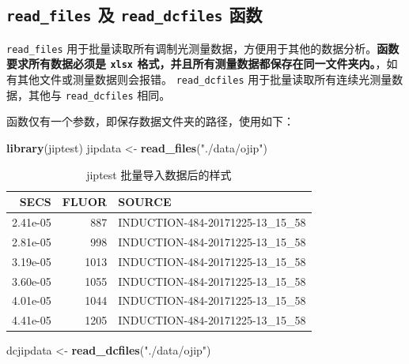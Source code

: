 \documentclass[]{krantz}
\makeatletter
\newenvironment{Shaded}{\begin{snugshade}}{\end{snugshade}}
\newcommand{\KeywordTok}[1]{\textcolor[rgb]{0.13,0.29,0.53}{\textbf{#1}}}
\newcommand{\StringTok}[1]{\textcolor[rgb]{0.31,0.60,0.02}{#1}}
\newcommand{\NormalTok}[1]{#1}
\newenvironment{kframe}{%
\medskip{}
\setlength{\fboxsep}{.8em}
 \def\at@end@of@kframe{}%
 \ifinner\ifhmode%
  \def\at@end@of@kframe{\end{minipage}}%
  \begin{minipage}{\columnwidth}%
 \fi\fi%
 \def\FrameCommand##1{\hskip\@totalleftmargin \hskip-\fboxsep
 \colorbox{shadecolor}{##1}\hskip-\fboxsep
     \hskip-\linewidth \hskip-\@totalleftmargin \hskip\columnwidth}%
 \MakeFramed {\advance\hsize-\width
   \@totalleftmargin\z@ \linewidth\hsize
   \@setminipage}}%
 {\par\unskip\endMakeFramed%
 \at@end@of@kframe}
\renewenvironment{Shaded}{\begin{kframe}}{\end{kframe}}
\theoremstyle{definition}
\theoremstyle{definition}
\theoremstyle{definition}
\theoremstyle{remark}
\makeatother
\begin{document}
\subsection{\texorpdfstring{\texttt{read\_files} 及
\texttt{read\_dcfiles}
函数}{read\_files 及 read\_dcfiles 函数}}\label{readfluor}

\texttt{read\_files}
用于批量读取所有调制光测量数据，方便用于其他的数据分析。\textbf{函数要求所有数据必须是
\texttt{xlsx}
格式，并且所有测量数据都保存在同一文件夹内。}，如有其他文件或测量数据则会报错。
\texttt{read\_dcfiles} 用于批量读取所有连续光测量数据，其他与
\texttt{read\_dcfiles} 相同。

函数仅有一个参数，即保存数据文件夹的路径，使用如下：

\begin{Shaded}
\begin{Highlighting}[]
\KeywordTok{library}\NormalTok{(jiptest)}
\NormalTok{jipdata <-}\StringTok{ }\KeywordTok{read_files}\NormalTok{(}\StringTok{"./data/ojip"}\NormalTok{)}
\end{Highlighting}
\end{Shaded}

\begin{table}

\caption{\label{tab:unnamed-chunk-25}jiptest 批量导入数据后的样式}
\centering
\begin{tabular}[t]{rrl}
\toprule
SECS & FLUOR & SOURCE\\
\midrule
2.41e-05 & 887 & INDUCTION-484-20171225-13\_15\_58\\
2.81e-05 & 998 & INDUCTION-484-20171225-13\_15\_58\\
3.19e-05 & 1013 & INDUCTION-484-20171225-13\_15\_58\\
3.60e-05 & 1055 & INDUCTION-484-20171225-13\_15\_58\\
4.01e-05 & 1044 & INDUCTION-484-20171225-13\_15\_58\\
4.41e-05 & 1205 & INDUCTION-484-20171225-13\_15\_58\\
\bottomrule
\end{tabular}
\end{table}

\begin{Shaded}
\begin{Highlighting}[]
\NormalTok{dcjipdata <-}\StringTok{ }\KeywordTok{read_dcfiles}\NormalTok{(}\StringTok{"./data/ojip"}\NormalTok{)}
\end{Highlighting}
\end{Shaded}
\end{document}
